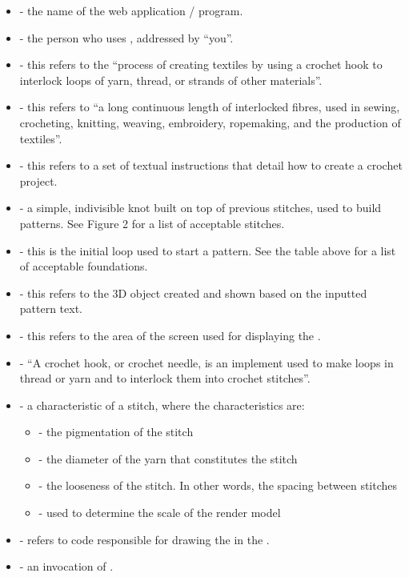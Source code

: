 \documentclass[main.tex]{subfiles}
\begin{document}
\begin{itemize}
\item \CC* - the name of the web application / program.
\item {} - the person who uses \CC, addressed by ``you''. 
\item {} - this refers to the ``process of creating textiles by using a crochet hook to interlock loops of yarn, thread, or strands of other materials''.
\item {} - this refers to ``a long continuous length of interlocked fibres, used in sewing, crocheting, knitting, weaving, embroidery, ropemaking, and the production of textiles''.
\item {} - this refers to a set of textual instructions that detail how to create a crochet project. 
\item {} - a simple, indivisible knot built on top of previous stitches, used to build patterns. See Figure 2 for a list of acceptable stitches.
\item {} - this is the initial loop used to start a pattern. See the table above for a list of acceptable foundations.
\item \RM* - this refers to the 3D object created and shown based on the inputted pattern text.
\item \CRW* - this refers to the area of the screen used for displaying the \RM.
\item {} - ``A crochet hook, or crochet needle, is an implement used to make loops in thread or yarn and to interlock them into crochet stitches''.
\item {} - a characteristic of a stitch, where the characteristics are:
    \begin{itemize}\compact
        \item {} - the pigmentation of the stitch
        \item {} - the diameter of the yarn that constitutes the stitch
        \item {} - the looseness of the stitch. In other words, the spacing between stitches
        \item {} - used to determine the scale of the render model
    \end{itemize}
\item \IR* - refers to \CC{} code responsible for drawing the \RM{} in the \CRW.
\item {} - an invocation of \CC.

\end{itemize}
\end{document}
